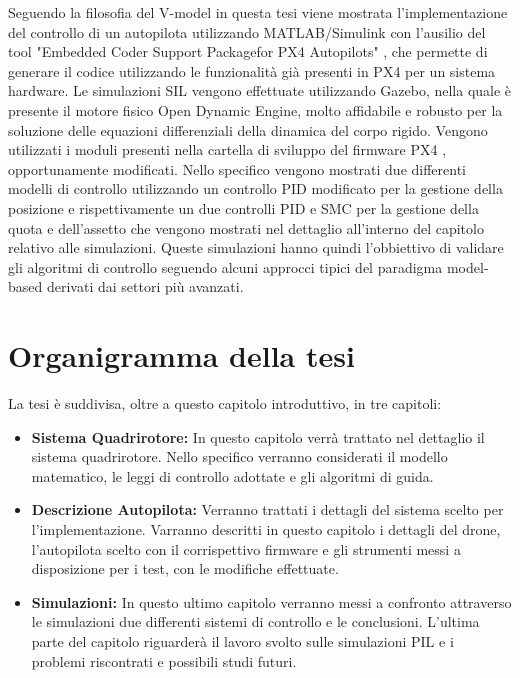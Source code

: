 Seguendo la filosofia del V-model in questa tesi viene mostrata l'implementazione del controllo di un autopilota utilizzando MATLAB/Simulink con l'ausilio del tool "Embedded Coder Support Packagefor PX4 Autopilots" \cite{toolPx4}, che permette di generare il codice utilizzando le funzionalità già presenti in PX4 per un sistema hardware. Le simulazioni SIL vengono effettuate utilizzando Gazebo, nella quale è presente il motore fisico Open Dynamic Engine, molto affidabile e robusto per la soluzione delle equazioni differenziali della dinamica del corpo rigido. Vengono utilizzati i moduli presenti nella cartella di sviluppo del firmware PX4 \cite{px4Firmware}, opportunamente modificati. Nello specifico vengono mostrati due differenti modelli di controllo utilizzando un controllo PID modificato per la gestione della posizione e rispettivamente un due controlli PID e SMC per la gestione della quota e dell'assetto che vengono mostrati nel dettaglio all'interno del capitolo relativo alle simulazioni. Queste simulazioni hanno quindi l'obbiettivo di validare gli algoritmi di controllo seguendo alcuni approcci tipici del paradigma model-based derivati dai settori più avanzati.


\section{Organigramma della tesi}
La tesi è suddivisa, oltre a questo capitolo introduttivo, in tre capitoli:
\begin{itemize}
	\item \textbf{Sistema Quadrirotore:} In questo capitolo verrà trattato nel dettaglio il sistema quadrirotore. Nello specifico verranno considerati il modello matematico, le leggi di controllo adottate e gli algoritmi di guida.
	\item \textbf{Descrizione Autopilota:} Verranno trattati i dettagli del sistema scelto per l'implementazione. Varranno descritti in questo capitolo i dettagli del drone, l'autopilota scelto con il corrispettivo firmware e gli strumenti messi a disposizione per i test, con le modifiche effettuate.
	\item \textbf{Simulazioni:} In questo ultimo capitolo verranno messi a confronto attraverso le simulazioni due differenti sistemi di controllo e le conclusioni. L'ultima parte del capitolo riguarderà il lavoro svolto sulle simulazioni PIL e i problemi riscontrati e possibili studi futuri.
\end{itemize}